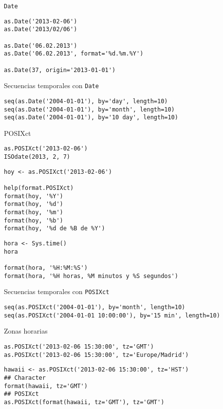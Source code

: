 \documentclass[xcolor={usenames,svgnames,dvipsnames}]{beamer}
\begin{document}
\begin{frame}[fragile,label=sec-5-2-1]{\texttt{Date}}
 \lstset{language=R,numbers=none}
\begin{lstlisting}
as.Date('2013-02-06')
as.Date('2013/02/06')

as.Date('06.02.2013')
as.Date('06.02.2013', format='%d.%m.%Y')

as.Date(37, origin='2013-01-01')
\end{lstlisting}
\end{frame}
\begin{frame}[fragile,label=sec-5-2-2]{Secuencias temporales con \texttt{Date}}
 \lstset{language=R,numbers=none}
\begin{lstlisting}
seq(as.Date('2004-01-01'), by='day', length=10)
seq(as.Date('2004-01-01'), by='month', length=10)
seq(as.Date('2004-01-01'), by='10 day', length=10)
\end{lstlisting}
\end{frame}
\begin{frame}[fragile,label=sec-5-2-3]{POSIXct}
 \lstset{language=R,numbers=none}
\begin{lstlisting}
as.POSIXct('2013-02-06')
ISOdate(2013, 2, 7)
\end{lstlisting}

\lstset{language=R,numbers=none}
\begin{lstlisting}
hoy <- as.POSIXct('2013-02-06')

help(format.POSIXct)
format(hoy, '%Y')
format(hoy, '%d')
format(hoy, '%m')
format(hoy, '%b')
format(hoy, '%d de %B de %Y')
\end{lstlisting}

\lstset{language=R,numbers=none}
\begin{lstlisting}
hora <- Sys.time()
hora

format(hora, '%H:%M:%S')
format(hora, '%H horas, %M minutos y %S segundos')
\end{lstlisting}
\end{frame}
\begin{frame}[fragile,label=sec-5-2-4]{Secuencias temporales con \texttt{POSIXct}}
 \lstset{language=R,numbers=none}
\begin{lstlisting}
seq(as.POSIXct('2004-01-01'), by='month', length=10)
seq(as.POSIXct('2004-01-01 10:00:00'), by='15 min', length=10)
\end{lstlisting}
\end{frame}
\begin{frame}[fragile,label=sec-5-2-5]{Zonas horarias}
 \lstset{language=R,numbers=none}
\begin{lstlisting}
as.POSIXct('2013-02-06 15:30:00', tz='GMT')
as.POSIXct('2013-02-06 15:30:00', tz='Europe/Madrid')
\end{lstlisting}

\lstset{language=R,numbers=none}
\begin{lstlisting}
hawaii <- as.POSIXct('2013-02-06 15:30:00', tz='HST')
## Character
format(hawaii, tz='GMT')
## POSIXct
as.POSIXct(format(hawaii, tz='GMT'), tz='GMT')
\end{lstlisting}
\end{frame}
\end{document}
